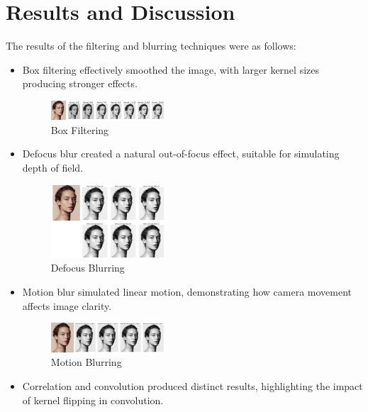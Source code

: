 \documentclass{report}
\begin{document}
\section{Results and Discussion}
The results of the filtering and blurring techniques were as follows:
\begin{itemize}
    \item Box filtering effectively smoothed the image, with larger kernel sizes producing stronger effects.
    \begin{figure}[h!]
    \centering
    \includegraphics[width=0.4\textwidth]{images/Exp-4-Results-1.png} %
    \caption{Box Filtering}
    \label{fig:exp-4-results}
\end{figure}
    \item Defocus blur created a natural out-of-focus effect, suitable for simulating depth of field.
    \begin{figure}[h!]
    \centering
    \includegraphics[width=0.4\textwidth]{images/Exp-4-Results-2.png} %
    \caption{Defocus Blurring}
    \label{fig:exp-4-results}
\end{figure}
    \item Motion blur simulated linear motion, demonstrating how camera movement affects image clarity.
    \begin{figure}[h!]
    \centering
    \includegraphics[width=0.4\textwidth]{images/Exp-4-Results-3.png} %
    \caption{Motion Blurring}
    \label{fig:exp-4-results}
\end{figure}
    \item Correlation and convolution produced distinct results, highlighting the impact of kernel flipping in convolution.
        \begin{figure}[h!]
    \centering

\end{figure}
\end{itemize}
\end{document}
